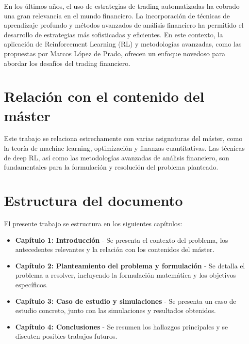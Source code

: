 \documentclass[a4paper,12pt]{report}
\begin{document}
En los últimos años, el uso de estrategias de trading automatizadas ha cobrado una gran relevancia en el mundo financiero. La incorporación de 
técnicas de aprendizaje profundo y métodos avanzados de análisis financiero ha permitido el desarrollo de estrategias más sofisticadas y eficientes. 
En este contexto, la aplicación de Reinforcement Learning (RL) y metodologías avanzadas, como las propuestas por Marcos López de Prado, ofrecen un 
enfoque novedoso para abordar los desafíos del trading financiero.




\section{Relación con el contenido del máster}

Este trabajo se relaciona estrechamente con varias asignaturas del máster, como la teoría de machine learning, optimización y finanzas 
cuantitativas. Las técnicas de deep RL, así como las metodologías avanzadas de análisis financiero, son fundamentales para la formulación 
y resolución del problema planteado.

\section{Estructura del documento}

El presente trabajo se estructura en los siguientes capítulos:

\begin{itemize}
    \item \textbf{Capítulo 1: Introducción} - Se presenta el contexto del problema, los antecedentes relevantes y la relación con los 
    contenidos del máster.
    \item \textbf{Capítulo 2: Planteamiento del problema y formulación} - Se detalla el problema a resolver, incluyendo la formulación 
    matemática y los objetivos específicos.
    \item \textbf{Capítulo 3: Caso de estudio y simulaciones} - Se presenta un caso de estudio concreto, junto con las simulaciones y 
    resultados obtenidos.
    \item \textbf{Capítulo 4: Conclusiones} - Se resumen los hallazgos principales y se discuten posibles trabajos futuros.
\end{itemize}
\end{document}
